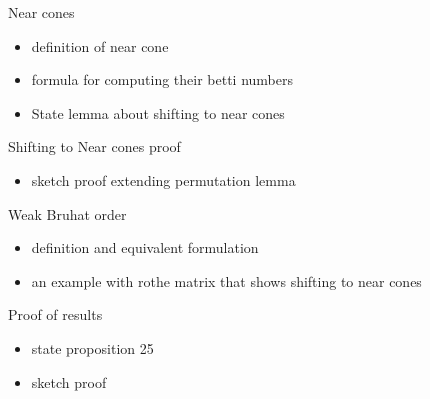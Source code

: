 \documentclass[9pt]{beamer}
\theoremstyle{definition}
\begin{document}

\begin{frame}[fragile]{ Near cones}
  \begin{itemize}
  \item definition of near cone
  \item formula for computing their betti numbers
  \item State lemma about shifting to near cones
  \end{itemize}
\end{frame}


\begin{frame}[fragile]{Shifting to Near cones proof}
  \begin{itemize}
  \item sketch proof extending permutation lemma
  \end{itemize}
\end{frame}


\begin{frame}[fragile]{Weak Bruhat order}
  \begin{itemize}
  \item definition and equivalent formulation
  \item an example with rothe matrix that shows shifting to near cones
  \end{itemize}
\end{frame}


\begin{frame}[fragile]{Proof of results}
  \begin{itemize}
  \item state proposition 25
  \item sketch proof
  \end{itemize}
\end{frame}
\end{document}

